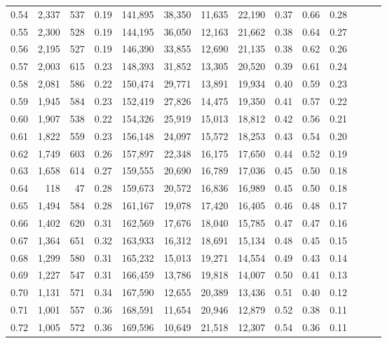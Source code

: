 \begin{tabular}{rrrrrrrrrrrrrr}
0.54 &  2,337 &  537 &  0.19 &  141,895 &   38,350 &  11,635 &  22,190 &  0.37 &  0.66 &      0.28 \\
0.55 &  2,300 &  528 &  0.19 &  144,195 &   36,050 &  12,163 &  21,662 &  0.38 &  0.64 &      0.27 \\
0.56 &  2,195 &  527 &  0.19 &  146,390 &   33,855 &  12,690 &  21,135 &  0.38 &  0.62 &      0.26 \\
0.57 &  2,003 &  615 &  0.23 &  148,393 &   31,852 &  13,305 &  20,520 &  0.39 &  0.61 &      0.24 \\
0.58 &  2,081 &  586 &  0.22 &  150,474 &   29,771 &  13,891 &  19,934 &  0.40 &  0.59 &      0.23 \\
0.59 &  1,945 &  584 &  0.23 &  152,419 &   27,826 &  14,475 &  19,350 &  0.41 &  0.57 &      0.22 \\
0.60 &  1,907 &  538 &  0.22 &  154,326 &   25,919 &  15,013 &  18,812 &  0.42 &  0.56 &      0.21 \\
0.61 &  1,822 &  559 &  0.23 &  156,148 &   24,097 &  15,572 &  18,253 &  0.43 &  0.54 &      0.20 \\
0.62 &  1,749 &  603 &  0.26 &  157,897 &   22,348 &  16,175 &  17,650 &  0.44 &  0.52 &      0.19 \\
0.63 &  1,658 &  614 &  0.27 &  159,555 &   20,690 &  16,789 &  17,036 &  0.45 &  0.50 &      0.18 \\
0.64 &    118 &   47 &  0.28 &  159,673 &   20,572 &  16,836 &  16,989 &  0.45 &  0.50 &      0.18 \\
0.65 &  1,494 &  584 &  0.28 &  161,167 &   19,078 &  17,420 &  16,405 &  0.46 &  0.48 &      0.17 \\
0.66 &  1,402 &  620 &  0.31 &  162,569 &   17,676 &  18,040 &  15,785 &  0.47 &  0.47 &      0.16 \\
0.67 &  1,364 &  651 &  0.32 &  163,933 &   16,312 &  18,691 &  15,134 &  0.48 &  0.45 &      0.15 \\
0.68 &  1,299 &  580 &  0.31 &  165,232 &   15,013 &  19,271 &  14,554 &  0.49 &  0.43 &      0.14 \\
0.69 &  1,227 &  547 &  0.31 &  166,459 &   13,786 &  19,818 &  14,007 &  0.50 &  0.41 &      0.13 \\
0.70 &  1,131 &  571 &  0.34 &  167,590 &   12,655 &  20,389 &  13,436 &  0.51 &  0.40 &      0.12 \\
0.71 &  1,001 &  557 &  0.36 &  168,591 &   11,654 &  20,946 &  12,879 &  0.52 &  0.38 &      0.11 \\
0.72 &  1,005 &  572 &  0.36 &  169,596 &   10,649 &  21,518 &  12,307 &  0.54 &  0.36 &      0.11 \\

\end{tabular}
